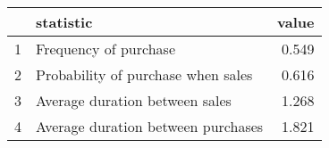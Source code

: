 \begin{tabular}{rlr}
  \hline
 & statistic & value \\ 
  \hline
1 & Frequency of purchase & 0.549 \\ 
  2 & Probability of purchase when sales & 0.616 \\ 
  3 & Average duration between sales & 1.268 \\ 
  4 & Average duration between purchases & 1.821 \\ 
   \hline
\end{tabular}

